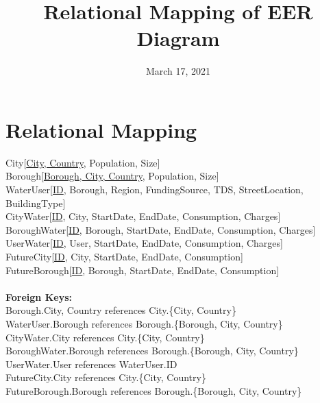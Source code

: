 \documentclass{article}
\title{Relational Mapping of EER Diagram}
\date{March 17, 2021}
\begin{document}
\maketitle


\section{Relational Mapping}
City[\underline{City, Country}, Population, Size] \\
Borough[\underline{Borough, City, Country}, Population, Size] \\
WaterUser[\underline{ID}, Borough, Region, FundingSource, TDS, StreetLocation, BuildingType] \\
CityWater[\underline{ID}, City, StartDate, EndDate, Consumption, Charges] \\
BoroughWater[\underline{ID}, Borough, StartDate, EndDate, Consumption, Charges] \\
UserWater[\underline{ID}, User, StartDate, EndDate, Consumption, Charges] \\
FutureCity[\underline{ID}, City, StartDate, EndDate, Consumption] \\
FutureBorough[\underline{ID}, Borough, StartDate, EndDate, Consumption]
\\~\\
\textbf{Foreign Keys:} \\
Borough.{City, Country} references City.\{City, Country\} \\
WaterUser.Borough references Borough.\{Borough, City, Country\} \\
CityWater.City references City.\{City, Country\} \\
BoroughWater.Borough references Borough.\{Borough, City, Country\} \\
UserWater.User references WaterUser.ID \\
FutureCity.City references City.\{City, Country\} \\
FutureBorough.Borough references Borough.\{Borough, City, Country\} \\
\end{document}
